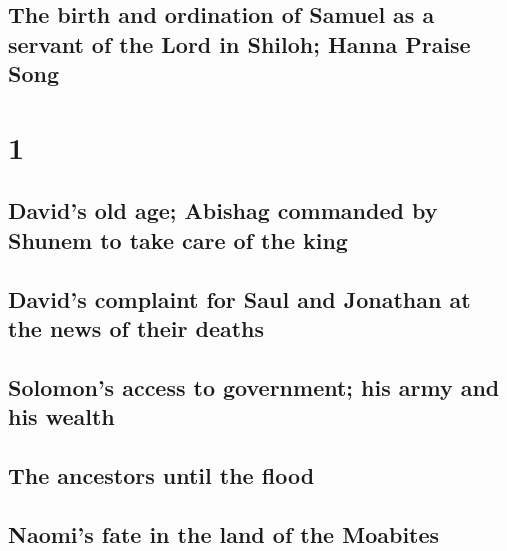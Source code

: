 \hypertarget{the-birth-and-ordination-of-samuel-as-a-servant-of-the-lord-in-shiloh-hanna-praise-song}{%
\subsection{The birth and ordination of Samuel as a servant of the Lord
in Shiloh; Hanna Praise
Song}\label{the-birth-and-ordination-of-samuel-as-a-servant-of-the-lord-in-shiloh-hanna-praise-song}}

\hypertarget{section}{%
\section{1}\label{section}}

\hypertarget{davids-old-age-abishag-commanded-by-shunem-to-take-care-of-the-king}{%
\subsection{David's old age; Abishag commanded by Shunem to take care of
the
king}\label{davids-old-age-abishag-commanded-by-shunem-to-take-care-of-the-king}}

\hypertarget{davids-complaint-for-saul-and-jonathan-at-the-news-of-their-deaths}{%
\subsection{David's complaint for Saul and Jonathan at the news of their
deaths}\label{davids-complaint-for-saul-and-jonathan-at-the-news-of-their-deaths}}

\hypertarget{solomons-access-to-government-his-army-and-his-wealth}{%
\subsection{Solomon's access to government; his army and his
wealth}\label{solomons-access-to-government-his-army-and-his-wealth}}

\hypertarget{the-ancestors-until-the-flood}{%
\subsection{The ancestors until the
flood}\label{the-ancestors-until-the-flood}}

\hypertarget{naomis-fate-in-the-land-of-the-moabites}{%
\subsection{Naomi's fate in the land of the
Moabites}\label{naomis-fate-in-the-land-of-the-moabites}}

